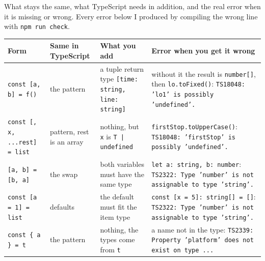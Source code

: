 \documentclass[
  10pt,
]{article}
\begin{document}
What stays the same, what TypeScript needs in addition, and the real
error when it is missing or wrong. Every error below I produced by
compiling the wrong line with \texttt{npm run check}.

\begin{longtable}[]{@{}>{\raggedright\arraybackslash}p{}>{\raggedright\arraybackslash}p{}>{\raggedright\arraybackslash}p{}>{\raggedright\arraybackslash}p{}@{}}
\toprule\noalign{}
Form & Same in TypeScript & What you add & Error when you get it
wrong \\
\midrule\noalign{}
\endhead
\bottomrule\noalign{}
\endlastfoot
1
\texttt{const [\allowbreak{}a,\allowbreak{} b] =\allowbreak{} f(\allowbreak{})}
& the pattern & a tuple return type
\texttt{[\allowbreak{}time:\allowbreak{} string,\allowbreak{} line:\allowbreak{} string]}
& without it the result is \texttt{number[\allowbreak{}]}, then
\texttt{lo.\allowbreak{}toFixed(\allowbreak{})}:
\texttt{TS18048:\allowbreak{} 'lo1' is possibly 'undefined'.\allowbreak{}} \\
2
\texttt{const [\allowbreak{},\allowbreak{} x,\allowbreak{} .\allowbreak{}.\allowbreak{}.\allowbreak{}rest] =\allowbreak{} list}
& pattern, rest is an array & nothing, but \texttt{x} is
\texttt{T |\allowbreak{} undefined} &
\texttt{firstStop.\allowbreak{}toUpperCase(\allowbreak{})}:
\texttt{TS18048:\allowbreak{} 'firstStop' is possibly 'undefined'.\allowbreak{}} \\
3
\texttt{[\allowbreak{}a,\allowbreak{} b] =\allowbreak{} [\allowbreak{}b,\allowbreak{} a]}
& the swap & both variables must have the same type &
\texttt{let a:\allowbreak{} string,\allowbreak{} b:\allowbreak{} number}:
\texttt{TS2322:\allowbreak{} Type 'number' is not assignable to type 'string'.\allowbreak{}} \\
4 \texttt{const [\allowbreak{}a =\allowbreak{} 1] =\allowbreak{} list} &
defaults & the default must fit the item type &
\texttt{const [\allowbreak{}x =\allowbreak{} 5]:\allowbreak{} string[\allowbreak{}] =\allowbreak{} [\allowbreak{}]}:
\texttt{TS2322:\allowbreak{} Type 'number' is not assignable to type 'string'.\allowbreak{}} \\
5 \texttt{const \{ a \} =\allowbreak{} t} & the pattern & nothing, the
types come from \texttt{t} & a name not in the type:
\texttt{TS2339:\allowbreak{} Property 'platform' does not exist on type .\allowbreak{}.\allowbreak{}.\allowbreak{}} \\

\end{longtable}
\end{document}
